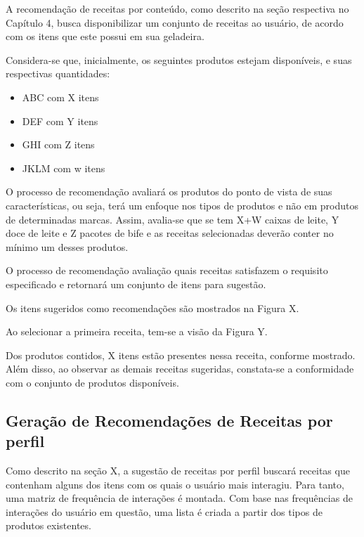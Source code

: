 A recomendação de receitas por conteúdo, como descrito na seção respectiva no Capítulo 4, busca disponibilizar um conjunto de receitas ao usuário, de acordo com os itens que este possui em sua geladeira. 

Considera-se que, inicialmente, os seguintes produtos estejam disponíveis, e suas respectivas quantidades:

\begin{itemize} \parskip -3pt
    \item ABC com X itens
    \item DEF com Y itens 
    \item GHI com Z itens
    \item JKLM com w itens
\end{itemize}

O processo de recomendação avaliará os produtos do ponto de vista de suas características, ou seja, terá um enfoque nos tipos de produtos e não em produtos de determinadas marcas. Assim, avalia-se que se tem X+W caixas de leite, Y doce de leite e Z pacotes de bife e as receitas selecionadas deverão conter no mínimo um desses produtos.

O processo de recomendação avaliação quais receitas satisfazem o requisito especificado e retornará um conjunto de itens para sugestão.

Os itens sugeridos como recomendações são mostrados na Figura X.


Ao selecionar a primeira receita, tem-se a visão da Figura Y.


Dos produtos contidos, X itens estão presentes nessa receita, conforme mostrado.
Além disso, ao observar as demais receitas sugeridas, constata-se a conformidade com o conjunto de produtos disponíveis.

\subsection{Geração de Recomendações de Receitas por perfil}

Como descrito na seção X, a sugestão de receitas por perfil buscará receitas que contenham alguns dos itens com os quais o usuário mais interagiu. Para tanto, uma matriz de frequência de interações é montada.  Com base nas frequências de interações do usuário em questão, uma lista é criada a partir dos tipos de produtos existentes.

